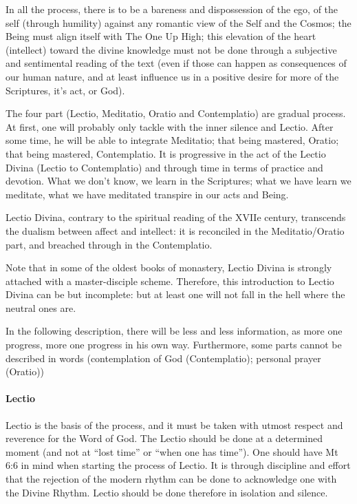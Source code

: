 In all the process, there is to be a bareness and dispossession of the ego, of the self (through humility) against any romantic view of the Self and the Cosmos; the Being must align itself with The One Up High; this elevation of the heart (intellect) toward the divine knowledge must not be done through a subjective and sentimental reading of the text (even if those can happen as consequences of our human nature, and at least influence us in a positive desire for more of the Scriptures, it's act, or God).

The four part (Lectio, Meditatio, Oratio and Contemplatio) are gradual process. At first, one will probably only tackle with the inner silence and Lectio. After some time, he will be able to integrate Meditatio; that being mastered, Oratio; that being mastered, Contemplatio. It is progressive in the act of the Lectio Divina (Lectio to Contemplatio) and through time in terms of practice and devotion. What we don't know, we learn in the Scriptures; what we have learn we meditate, what we have meditated transpire in our acts and Being.

Lectio Divina, contrary to the spiritual reading of the XVIIe century, transcends the dualism between affect and intellect: it is reconciled in the Meditatio/Oratio part, and breached through in the Contemplatio.

Note that in some of the oldest books of monastery, Lectio Divina is strongly attached with a master-disciple scheme. Therefore, this introduction to Lectio Divina can be but incomplete: but at least one will not fall in the hell where the neutral ones are.

In the following description, there will be less and less information, as more one progress, more one progress in his own way. Furthermore, some parts cannot be described in words (contemplation of God (Contemplatio); personal prayer (Oratio))

\paragraph{Lectio}
Lectio is the basis of the process, and it must be taken with utmost respect and reverence for the Word of God. The Lectio should be done at a determined moment (and not at ``lost time” or ``when one has time”). One should have Mt 6:6 in mind when starting the process of Lectio. It is through discipline and effort that the rejection of the modern rhythm can be done to acknowledge one with the Divine Rhythm. Lectio should be done therefore in isolation and silence.

